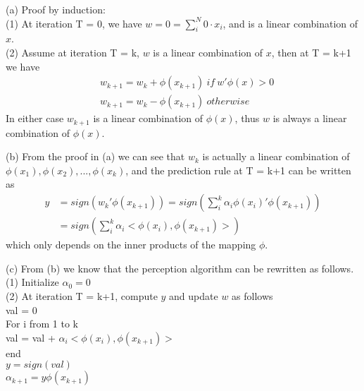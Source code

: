 \documentclass[12pt]{article}
\newenvironment{problem}[2][Problem]{\begin{trivlist}
\item[\hskip \labelsep {\bfseries #1}\hskip \labelsep {\bfseries #2}]}{\end{trivlist}}
\begin{document}
\begin{problem}{2. Kernalized Perception}
\item{(a)} Proof by induction:\\
(1) At iteration T = 0, we have $w = 0 = \sum_i^N 0\cdot x_i$, and is a linear combination of $x$.\\
(2) Assume at iteration T = k, $w$ is a linear combination of $x$, then at T = k+1 we have 
\begin{align*}
&w_{k+1} = w_k + \phi(x_{k+1}) \ if \ w'\phi(x) > 0\\
&w_{k+1} = w_k - \phi(x_{k+1}) \ otherwise
\end{align*}
In either case $w_{k+1}$ is a linear combination of $\phi(x)$, thus $w$ is always a linear combination of $\phi(x)$.
\\
\item{(b)} From the proof in (a) we can see that $w_k$ is actually a linear combination of $\phi(x_1), \phi(x_2), ..., \phi(x_k)$, and the prediction rule at T = k+1 can be written as
\begin{align*}
	y &= sign(w_k'\phi(x_{k+1})) = sign(\sum_i^{k} \alpha_i\phi(x_i)'\phi(x_{k+1})) \\
	  &= sign(\sum_i^{k} \alpha_i<\phi(x_i), \phi(x_{k+1})>)
\end{align*}
which only depends on the inner products of the mapping $\phi$.
\\
\item{(c)}
From (b) we know that the perception algorithm can be rewritten as follows.\\
(1) Initialize $\alpha_0 = 0$\\
(2) At iteration T = k+1, compute $y$ and update $w$ as follows\\
\indent val = 0\\
\indent For i from 1 to k\\
\indent \indent val = val + $\alpha_i <\phi(x_i), \phi(x_{k+1})>$\\
\indent end\\
\indent $y = sign(val)$\\
\indent $\alpha_{k+1} = y\phi(x_{k+1})$\\
\end{problem}
\end{document}

